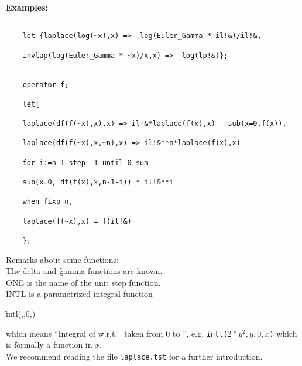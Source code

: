 \pagebreak
\textbf{Examples:}
\begin{verbatim}

    let {laplace(log(~x),x) => -log(Euler_Gamma * il!&)/il!&,

    invlap(log(Euler_Gamma * ~x)/x,x) => -log(lp!&)};


    operator f;

    let{

    laplace(df(f(~x),x),x) => il!&*laplace(f(x),x) - sub(x=0,f(x)),

    laplace(df(f(~x),x,~n),x) => il!&**n*laplace(f(x),x) -

    for i:=n-1 step -1 until 0 sum

    sub(x=0, df(f(x),x,n-1-i)) * il!&**i

    when fixp n,

    laplace(f(~x),x) = f(il!&)

    };

\end{verbatim}


Remarks about some functions: \\[\baselineskip]
The \f{delta} and \f{gamma} functions are known. \\
ONE is the name of the unit step function. \\
INTL is a parametrized integral function
\begin{syntax}
\f{intl}(,,0,)
\end{syntax}
which means ``Integral of  w.r.t.~ taken from 0 to '',
e.g. \texttt{intl($2{*}y^2,y,0,x$)} which is formally a function in $x$.\\
We recommend reading the file \texttt{laplace.tst} for a further introduction.
